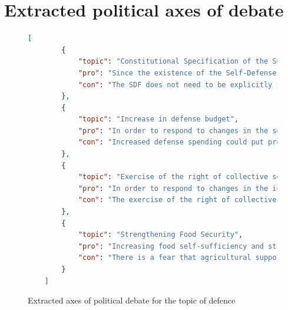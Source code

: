 \documentclass[final,5p,times,twocolumn,authoryear]{elsarticle}
\begin{document}
\FloatBarrier

\onecolumn
\section{Extracted political axes of debate}
\begin{figure}[h]
\centering
      \begin{lstlisting}[language=json,firstnumber=1]
    [
        {
            "topic": "Constitutional Specification of the Self-Defense Forces",
            "pro": "Since the existence of the Self-Defense Forces is already accepted by the public, their enshrining in the Constitution would strengthen their international credibility and legal stability.",
            "con": "The SDF does not need to be explicitly stated in the Constitution; the existing legal system is sufficient. Specifying it would create legal challenges and could undermine the spirit of exclusive defense."
        },
        {
            "topic": "Increase in defense budget",
            "pro": "In order to respond to changes in the security environment surrounding Japan, defense capabilities must be strengthened. Specifically, it is necessary to introduce advanced technologies such as missile defense and cyber security.",
            "con": "Increased defense spending could put pressure on social security and education budgets. In addition, it is difficult to gain public understanding to allocate reconstruction funds and tax increases to defense spending."
        },
        {
            "topic": "Exercise of the right of collective self-defense",
            "pro": "In order to respond to changes in the international security environment, the exercise of the right of collective self-defense should be clearly stated in the Constitution and defense policy should be modernized",
            "con": "The exercise of the right of collective self-defense deviates from the principle of exclusive defense, and constitutional amendments and changes in interpretation should be pursued with caution. It could increase the risk of war."
        },
        {
            "topic": "Strengthening Food Security",
            "pro": "Increasing food self-sufficiency and strengthening the agricultural production base is important for national security. We need to increase domestic production and stabilize people's livelihoods.",
            "con": "There is a fear that agricultural support may be put on the back burner due to the expansion of the defense budget. In addition, increasing self-sufficiency requires not only state initiative, but also private-sector strength."
        }
    ]
\end{lstlisting}

\caption{Extracted axes of political debate for the topic of defence}
\label{fig: extracted axes defense}
\end{figure}
\end{document}
